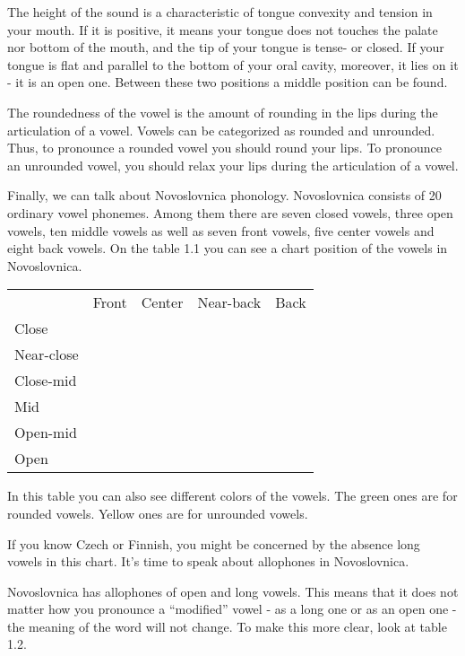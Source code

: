 The height of the sound is a characteristic of tongue convexity and tension in your mouth. If it is positive, it means your tongue does not touches the palate nor bottom of the mouth, and the tip of your tongue is tense- or closed. If your tongue is flat and parallel to the bottom of your oral cavity, moreover, it lies on it - it is an open one. Between these two positions a middle position can be found.

The roundedness of the vowel is the amount of rounding in the lips during the articulation of a vowel. Vowels can be categorized as rounded and unrounded. Thus, to pronounce a rounded vowel you should round your lips. To pronounce an unrounded vowel, you should relax your lips during the articulation of a vowel.

Finally, we can talk about Novoslovnica phonology. Novoslovnica consists of 20 ordinary vowel phonemes. Among them there are seven closed vowels, three open vowels, ten middle vowels as well as seven front vowels, five center vowels and eight back vowels. On the table 1.1 you can see a chart position of the vowels in Novoslovnica.

\begin{table}[]
	\begin{tabular}{lllll}
		& Front & Center & Near-back & Back \\
		Close      &       &        &           &      \\
		Near-close &       &        &           &      \\
		Close-mid  &       &        &           &      \\
		Mid        &       &        &           &      \\
		Open-mid   &       &        &           &      \\
		Open       &       &        &           &     
	\end{tabular}
\end{table}

In this table you can also see different colors of the vowels. The green ones are for rounded vowels. Yellow ones are for unrounded vowels.

If you know Czech or Finnish, you might be concerned by the absence long vowels in this chart. It’s time to speak about allophones in Novoslovnica.

Novoslovnica has allophones of open and long vowels. This means that it does not matter how you pronounce a “modified” vowel - as a long one or as an open one - the meaning of the word will not change. To make this more clear, look at table 1.2.

